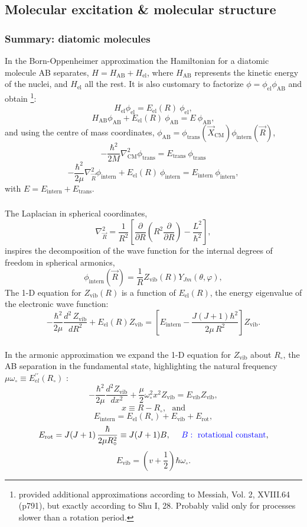\subsection{Molecular excitation \& molecular structure}
\begin{frame}\frametitle{Summary: diatomic molecules}

In the Born-Oppenheimer approximation the Hamiltonian for a diatomic
molecule AB separates, $H = H_\mathrm{AB} + H_\mathrm{el} $, where
$H_\mathrm{AB}$ represents the kinetic energy of the nuclei, and
$H_\mathrm{el}$ all the rest. It is also customary to factorize $\phi =
\phi_\mathrm{el}
\phi_\mathrm{AB}$ and obtain  \footnote{provided additional
approximations according to Messiah, Vol. 2, XVIII.64 (p791), but
exactly according to Shu I, 28. Probably valid only for processes
slower than a rotation period.}:
\[H_\mathrm{el}  \phi_\mathrm{el} = E_\mathrm{el}(R)~  \phi_\mathrm{el}, \] 
\[H_\mathrm{AB}  \phi_\mathrm{AB} +  E_\mathrm{el}(R)~ \phi_\mathrm{AB} = E~ \phi_\mathrm{AB}, \] 
and using the centre of mass coordinates, $\phi_\mathrm{AB} =
\phi_\mathrm{trans}(\vec{X}_\mathrm{CM}) \phi_\mathrm{intern}(\vec{R})
$,
\[ -\frac{\hbar^2}{2M} \nabla^2_\mathrm{CM} \phi_\mathrm{trans}  = E_\mathrm{trans} ~\phi_\mathrm{trans} \]
\[ -\frac{\hbar^2}{2\mu} \nabla^2_{\vec{R}} \phi_\mathrm{intern} + E_\mathrm{el}(R) ~\phi_\mathrm{intern}  = E_\mathrm{intern} ~\phi_\mathrm{intern},\]
with $E=E_\mathrm{intern}+E_\mathrm{trans}$.
\end{frame} \begin{frame}\frametitle{}
The Laplacian in spherical coordinates,
\[ \nabla^2_{\vec{R}} = \frac{1}{R^2} \left[ \frac{\partial}{\partial R} \left( R^2  \frac{\partial}{\partial R}  \right) - \frac{L^2}{\hbar^2} \right], \]
inspires the decomposition of the wave function for the internal
degrees of freedom in spherical armonics,
\[\phi_\mathrm{intern}(\vec{R}) = \frac{1}{R} Z_\mathrm{vib}(R) Y_{Jm}(\theta,\varphi), \]
The 1-D equation for $Z_\mathrm{vib}(R)$ is a function of
$E_\mathrm{el}(R)$, the energy eigenvalue of the electronic wave function:
\[-\frac{\hbar^2}{2\mu} \frac{d^2\,Z_\mathrm{vib}}{dR^2} +
E_\mathrm{el}(R)  Z_\mathrm{vib} = \left[ E_\mathrm{intern}  - \frac{
    J (J + 1) \hbar^2} {2\mu\,R^2} \right] Z_\mathrm{vib}. \]


\end{frame} \begin{frame}\frametitle{} 
In the armonic approximation we expand the 1-D equation for
$Z_\mathrm{vib}$ about $R_{\circ}$, the AB separation in the
fundamental state, highlighting the natural frequency $\mu
\omega_\circ \equiv E^{\prime\prime}_{el}(R_\circ)$ :
\[ - \frac{\hbar^2}{2\mu} \frac{d^2 Z_\mathrm{vib}}{dx^2} + \frac{\mu}{2} \omega^2_\circ x^2 Z_\mathrm{vib} = E_\mathrm{vib} Z_\mathrm{vib}, \]
\[ x \equiv R - R_{\circ} , ~~~\mathrm{and}\] 
\[ \boxed{ E_\mathrm{intern} = E_\mathrm{el}(R_\circ) + E_\mathrm{vib} + E_\mathrm{rot},} \] 
\[ E_\mathrm{rot} = J (J+1) \, \frac{\hbar}{2\mu R^2_\circ} \equiv J
(J+1) B, ~~~~\textcolor{blue}{B: \mathrm{ ~rotational~constant}}, \]
\[ E_\mathrm{vib}  = (v + \frac{1}{2} ) \hbar \omega_\circ.  \]



\end{frame}
